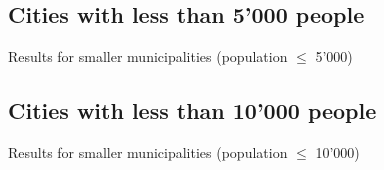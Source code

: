 
\subsection{Cities with less than 5'000 people}


\justifying
\noindent
Results for smaller municipalities (population \(\leq\) 5'000) \\

\vspace{5}







\subsection{Cities with less than 10'000 people}


\justifying
\noindent
Results for smaller municipalities (population \(\leq\) 10'000) \\

\vspace{5}




